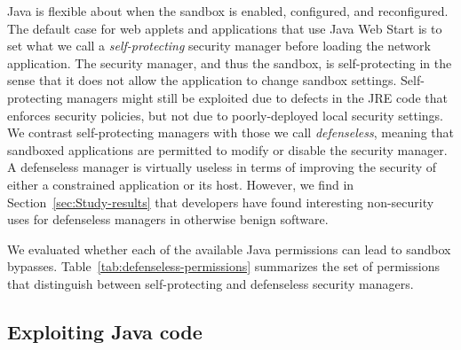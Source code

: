 \documentclass{sig-alternate}
\begin{document}
Java is flexible about when the sandbox
is enabled, configured, and reconfigured. The default case for web applets and applications
that use Java Web Start is to set what we call a \textit{self-protecting} security
manager before loading the network application. The security
manager, and thus the sandbox, is self-protecting in the sense that
it does not allow the application to change sandbox settings. Self-protecting managers might
still be exploited due to defects in the JRE code that enforces security
policies, but not due to poorly-deployed local security settings. We contrast
self-protecting managers with those we call 
\textit{defenseless}, meaning that sandboxed applications are 
permitted to modify or disable the security manager.  
A defenseless manager is virtually useless in terms of improving the
security of either a constrained application or its host. However, we find
in Section~\ref{sec:Study-results} that developers
have found interesting non-security uses for defenseless managers in otherwise
benign software.

We evaluated whether each of the available Java permissions
can lead to sandbox bypasses. Table~\ref{tab:defenseless-permissions} summarizes the set of permissions
that distinguish between self-protecting and defenseless security
managers.

\subsection{Exploiting Java code}
\label{sec:javaexploits}
\end{document}
